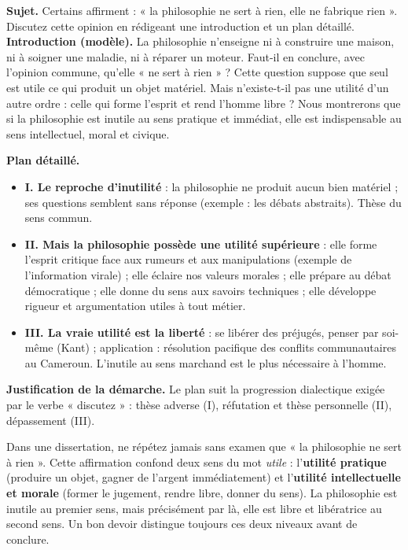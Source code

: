 \documentclass[11pt]{article}
\begin{document}
\begin{exoresolu}
\textbf{Sujet.} Certains affirment : « la philosophie ne sert à rien, elle ne fabrique rien ». Discutez cette opinion en rédigeant une introduction et un plan détaillé.
\tcblower
\textbf{Introduction (modèle).} La philosophie n'enseigne ni à construire une maison, ni à soigner une maladie, ni à réparer un moteur. Faut-il en conclure, avec l'opinion commune, qu'elle « ne sert à rien » ? Cette question suppose que seul est utile ce qui produit un objet matériel. Mais n'existe-t-il pas une utilité d'un autre ordre : celle qui forme l'esprit et rend l'homme libre ? Nous montrerons que si la philosophie est inutile au sens pratique et immédiat, elle est indispensable au sens intellectuel, moral et civique.

\textbf{Plan détaillé.}
\begin{itemize}
\item \textbf{I. Le reproche d'inutilité} : la philosophie ne produit aucun bien matériel ; ses questions semblent sans réponse (exemple : les débats abstraits). Thèse du sens commun.
\item \textbf{II. Mais la philosophie possède une utilité supérieure} : elle forme l'esprit critique face aux rumeurs et aux manipulations (exemple de l'information virale) ; elle éclaire nos valeurs morales ; elle prépare au débat démocratique ; elle donne du sens aux savoirs techniques ; elle développe rigueur et argumentation utiles à tout métier.
\item \textbf{III. La vraie utilité est la liberté} : se libérer des préjugés, penser par soi-même (Kant) ; application : résolution pacifique des conflits communautaires au Cameroun. L'inutile au sens marchand est le plus nécessaire à l'homme.
\end{itemize}
\textbf{Justification de la démarche.} Le plan suit la progression dialectique exigée par le verbe « discutez » : thèse adverse (I), réfutation et thèse personnelle (II), dépassement (III).
\end{exoresolu}

\begin{attention}
Dans une dissertation, ne répétez jamais sans examen que « la philosophie ne sert à rien ». Cette affirmation confond deux sens du mot \emph{utile} : l'\textbf{utilité pratique} (produire un objet, gagner de l'argent immédiatement) et l'\textbf{utilité intellectuelle et morale} (former le jugement, rendre libre, donner du sens). La philosophie est inutile au premier sens, mais précisément par là, elle est libre et libératrice au second sens. Un bon devoir distingue toujours ces deux niveaux avant de conclure.
\end{attention}
\end{document}
